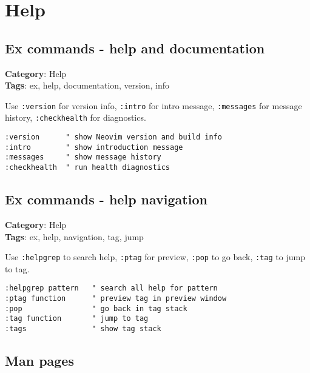 {{{{{{\chapter{Help}
\section{Ex commands - help and documentation}

\textbf{Category}: Help\\ \textbf{Tags}: ex, help, documentation, version, info
\vspace{0.5cm}

Use {\footnotesize \Verb§:version§} for version info, {\footnotesize \Verb§:intro§} for intro message, {\footnotesize \Verb§:messages§} for message history, {\footnotesize \Verb§:checkhealth§} for diagnostics.

\begin{Exa*}{}
\begin{Verbatim}[fontsize=\footnotesize, breaklines, breakanywhere]
:version      " show Neovim version and build info
:intro        " show introduction message
:messages     " show message history
:checkhealth  " run health diagnostics
\end{Verbatim}
\end{Exa*}

\section{Ex commands - help navigation}

\textbf{Category}: Help\\ \textbf{Tags}: ex, help, navigation, tag, jump
\vspace{0.5cm}

Use {\footnotesize \Verb§:helpgrep§} to search help, {\footnotesize \Verb§:ptag§} for preview, {\footnotesize \Verb§:pop§} to go back, {\footnotesize \Verb§:tag§} to jump to tag.

\begin{Exa*}{}
\begin{Verbatim}[fontsize=\footnotesize, breaklines, breakanywhere]
:helpgrep pattern   " search all help for pattern
:ptag function      " preview tag in preview window
:pop                " go back in tag stack
:tag function       " jump to tag
:tags               " show tag stack
\end{Verbatim}
\end{Exa*}

\section{Man pages}

}}}}}}
